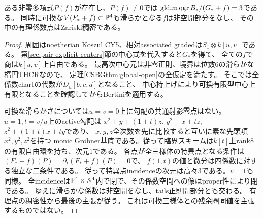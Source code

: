 \begin{corollary}[剛体周囲の中の正則な四係数非同型族]
\label{rem:moduli-rigid-generic-smoothness}
ある非零多項式$P(f)$が存在し、$P(f)\ne0$では
$\operatorname{gldim}\operatorname{qgr} B_*/(G_*+f)=3$である。
同時に可換な$V(F_*+f)\subset\mathbb P^4$も滑らかとなる$f$は非空開部分をなし、
その中の有理係数点はZariski稠密である。
\end{corollary}
\begin{proof}
周囲はnoetherian Koszul CY5、相対associated gradedは$S_1\otimes k[u,v]$である。
第\ref{sec:pair-explicit-centers}節の中心式を代入すると$G_*$を得て、
全ての$f$で商は$k[u,v]$上自由である。
最高次中心元は非零正則、境界は位数6の滑らかな楕円THCRなので、
定理\ref{CSBGthm:global-open}の全仮定を満たす。
そこでは全係数chartの代数が$D_u[b,c,d]$となること、
中心持上げにより可換有限型中心上有限となることを確認してからBertiniを適用する。

可換な滑らかさについては$u=v=0$上に勾配の共通射影零点はない。
$u=1,t=v/u$上のactive勾配は
$x^2+y+(1+t)z$, $y^2+x+tz$, $z^2+(1+t)x+ty$であり、
$x,y,z$全次数を先に比較すると互いに素な先頭項$x^2,y^2,z^2$を持つ
monic Gr\"obner基底である。従って臨界スキームは$k[t]$上rank8の有限自由環を持ち、次元1である。
各点が全三様体の特異点となる条件は$(F_*+f)(P)=\partial_t(F_*+f)(P)=0$で、
$f(1,t)$の値と微分は四係数に対する独立な二条件である。
従って特異点incidenceの次元は高々3である。$v=1$も同様。
全incidenceは$\mathbb P^4\times\mathbb A^4$内で閉で、その係数空間への像はproper性により閉である。
ゆえに滑らかな係数は非空開をなし、tails正則開部分とも交わる。
有理点の稠密性から最後の主張が従う。
これは可換三様体との残余圏同値を主張するものではない。
\end{proof}

